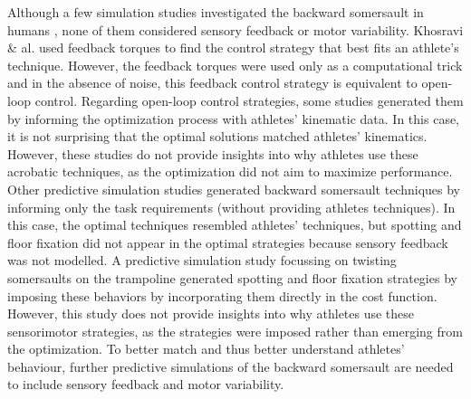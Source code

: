 \documentclass[10pt,letterpaper]{article}
\begin{document}
Although a few simulation studies investigated the backward somersault in humans \cite{khosravi1987control, leboeuf2012optimal, pettersson2013optimisation, farr2025including}, none of them considered sensory feedback or motor variability.  
Khosravi \& al. \cite{khosravi1987control} used feedback torques to find the control strategy that best fits an athlete's technique.
However, the feedback torques were used only as a computational trick and in the absence of noise, this feedback control strategy is equivalent to open-loop control. 
Regarding open-loop control strategies, some studies \cite{khosravi1987control, leboeuf2012optimal} generated them by informing the optimization process with athletes' kinematic data.
In this case, it is not surprising that the optimal solutions matched athletes' kinematics.
However, these studies do not provide insights into why athletes use these acrobatic techniques, as the optimization did not aim to maximize performance.
Other predictive simulation studies \cite{pettersson2013optimisation, farr2025including} generated backward somersault techniques by informing only the task requirements (without providing athletes techniques).
In this case, the optimal techniques resembled athletes' techniques, but spotting and floor fixation did not appear in the optimal strategies because sensory feedback was not modelled.
A predictive simulation study focussing on twisting somersaults on the trampoline \cite{charbonneau2025including} generated spotting and floor fixation strategies by imposing these behaviors by incorporating them directly in the cost function.
However, this study does not provide insights into why athletes use these sensorimotor strategies, as the strategies were imposed rather than emerging from the optimization. 
To better match and thus better understand athletes' behaviour, further predictive simulations of the backward somersault are needed to include sensory feedback and motor variability.
\end{document}
